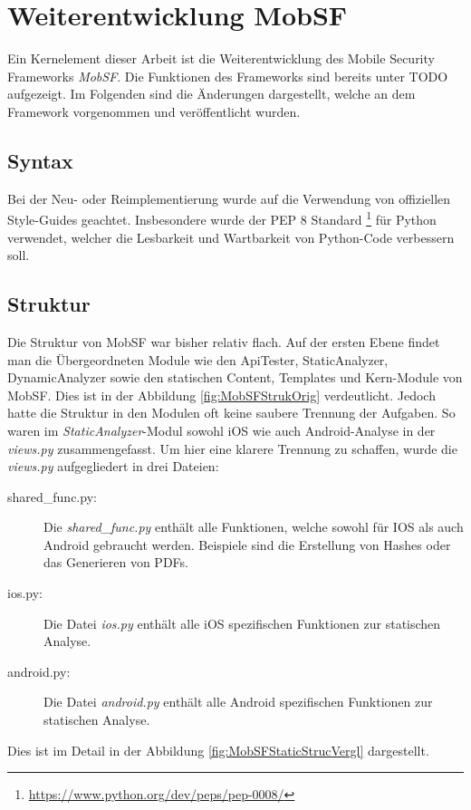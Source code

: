 \section{Weiterentwicklung MobSF}
Ein Kernelement dieser Arbeit ist die Weiterentwicklung des Mobile Security Frameworks \textit{MobSF}. Die Funktionen des Frameworks sind bereits unter TODO aufgezeigt. Im Folgenden sind die Änderungen dargestellt, welche an dem Framework vorgenommen und veröffentlicht wurden.

\subsection{Syntax}
Bei der Neu- oder Reimplementierung wurde auf die Verwendung von offiziellen Style-Guides geachtet. Insbesondere wurde der PEP 8 Standard \footnote{\url{https://www.python.org/dev/peps/pep-0008/}} für Python verwendet, welcher die Lesbarkeit und Wartbarkeit von Python-Code verbessern soll.

\subsection{Struktur}
Die Struktur von MobSF war bisher relativ flach. Auf der ersten Ebene findet man die Übergeordneten Module wie den ApiTester, StaticAnalyzer, DynamicAnalyzer sowie den statischen Content, Templates und Kern-Module von MobSF. Dies ist in der Abbildung \ref{fig:MobSFStrukOrig} verdeutlicht. Jedoch hatte die Struktur in den Modulen oft keine saubere Trennung der Aufgaben. So waren im \textit{StaticAnalyzer}-Modul sowohl iOS wie auch Android-Analyse in der \textit{views.py} zusammengefasst. Um hier eine klarere Trennung zu schaffen, wurde die \textit{views.py} aufgegliedert in drei Dateien:
\begin{description}
	\item[shared\_func.py: ] Die \textit{shared\_func.py} enthält alle Funktionen, welche sowohl für IOS als auch Android gebraucht werden. Beispiele sind die Erstellung von Hashes oder das Generieren von PDFs.
	
	\item[ios.py: ] Die Datei \textit{ios.py} enthält alle iOS spezifischen Funktionen zur statischen Analyse.
	
	\item[android.py: ] Die Datei \textit{android.py} enthält alle Android spezifischen Funktionen zur statischen Analyse.
\end{description}
Dies ist im Detail in der Abbildung \ref{fig:MobSFStaticStrucVergl} dargestellt.


